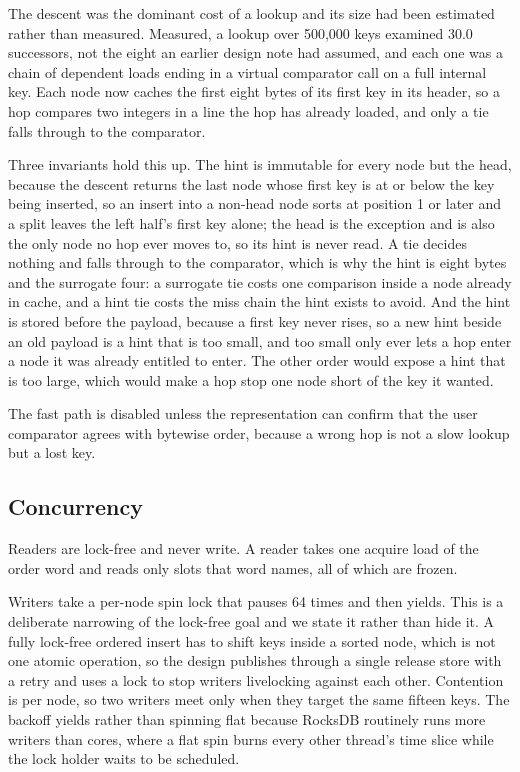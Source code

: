 \documentclass[conference]{IEEEtran}
\begin{document}
The descent was the dominant cost of a lookup and its size had been estimated
rather than measured. Measured, a lookup over 500{,}000 keys examined 30.0
successors, not the eight an earlier design note had assumed, and each one was a
chain of dependent loads ending in a virtual comparator call on a full internal
key. Each node now caches the first eight bytes of its first key in its header, so
a hop compares two integers in a line the hop has already loaded, and only a tie
falls through to the comparator.

Three invariants hold this up. The hint is immutable for every node but the head,
because the descent returns the last node whose first key is at or below the key
being inserted, so an insert into a non-head node sorts at position 1 or later and
a split leaves the left half's first key alone; the head is the exception and is
also the only node no hop ever moves to, so its hint is never read. A tie decides
nothing and falls through to the comparator, which is why the hint is eight bytes
and the surrogate four: a surrogate tie costs one comparison inside a node already
in cache, and a hint tie costs the miss chain the hint exists to avoid. And the
hint is stored before the payload, because a first key never rises, so a new hint
beside an old payload is a hint that is too small, and too small only ever lets a
hop enter a node it was already entitled to enter. The other order would expose a
hint that is too large, which would make a hop stop one node short of the key it
wanted.

The fast path is disabled unless the representation can confirm that the user
comparator agrees with bytewise order, because a wrong hop is not a slow lookup
but a lost key.

\subsection{Concurrency}

Readers are lock-free and never write. A reader takes one acquire load of the
order word and reads only slots that word names, all of which are frozen.

Writers take a per-node spin lock that pauses 64 times and then yields. This is a
deliberate narrowing of the lock-free goal \cite{herlihy2008art} and we state it
rather than hide it. A fully lock-free ordered insert has to shift keys inside a
sorted node, which is
not one atomic operation, so the design publishes through a single release store
with a retry and uses a lock to stop writers livelocking against each other.
Contention is per node, so two writers meet only when they target the same fifteen
keys. The backoff yields rather than spinning flat because RocksDB routinely runs
more writers than cores, where a flat spin burns every other thread's time slice
while the lock holder waits to be scheduled.
\end{document}
